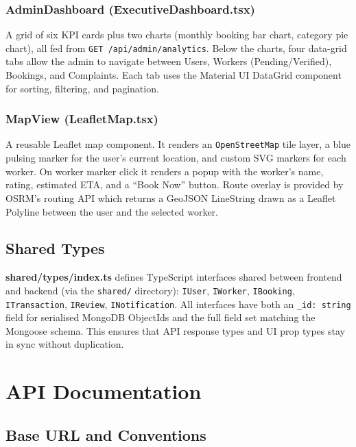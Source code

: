 \documentclass[12pt,a4paper]{report}
\begin{document}
\subsection{AdminDashboard (ExecutiveDashboard.tsx)}

A grid of six KPI cards plus two charts (monthly booking bar chart, category pie chart), all fed from \texttt{GET /api/admin/analytics}. Below the charts, four data-grid tabs allow the admin to navigate between Users, Workers (Pending/Verified), Bookings, and Complaints. Each tab uses the Material UI DataGrid component for sorting, filtering, and pagination.

\subsection{MapView (LeafletMap.tsx)}

A reusable Leaflet map component. It renders an \texttt{OpenStreetMap} tile layer, a blue pulsing marker for the user's current location, and custom SVG markers for each worker. On worker marker click it renders a popup with the worker's name, rating, estimated ETA, and a ``Book Now'' button. Route overlay is provided by OSRM's routing API which returns a GeoJSON LineString drawn as a Leaflet Polyline between the user and the selected worker.

\section{Shared Types}

\textbf{shared/types/index.ts} defines TypeScript interfaces shared between frontend and backend (via the \texttt{shared/} directory):
\texttt{IUser}, \texttt{IWorker}, \texttt{IBooking}, \texttt{ITransaction}, \texttt{IReview}, \texttt{INotification}. All interfaces have both an \texttt{\_id: string} field for serialised MongoDB ObjectIds and the full field set matching the Mongoose schema. This ensures that API response types and UI prop types stay in sync without duplication.

\chapter{API Documentation}

\section{Base URL and Conventions}
\end{document}
